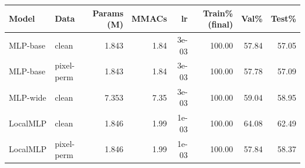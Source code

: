 \begin{tabular}{llrrrrrr}
\toprule
Model & Data & Params (M) & MMACs & lr & Train\% (final) & Val\% & Test\% \\
\midrule
MLP-base & clean & 1.843 & 1.84 & 3e-03 & 100.00 & 57.84 & 57.05 \\
MLP-base & pixel-perm & 1.843 & 1.84 & 3e-03 & 100.00 & 57.78 & 57.09 \\
MLP-wide & clean & 7.353 & 7.35 & 3e-03 & 100.00 & 59.04 & 58.95 \\
LocalMLP & clean & 1.846 & 1.99 & 1e-03 & 100.00 & 64.08 & 62.49 \\
LocalMLP & pixel-perm & 1.846 & 1.99 & 1e-03 & 100.00 & 57.84 & 58.37 \\
\bottomrule
\end{tabular}

